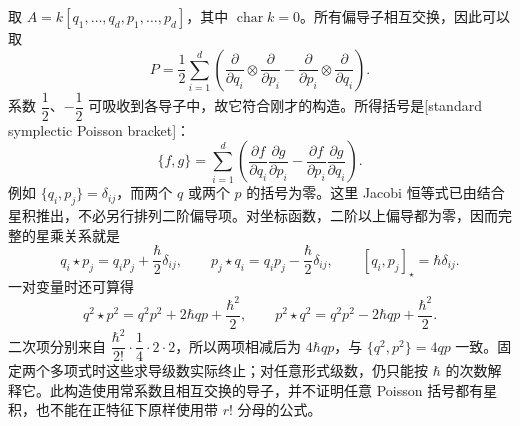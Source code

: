 取 \(A=k[q_1,\ldots,q_d,p_1,\ldots,p_d]\)，其中 \(\operatorname{char}k=0\)。所有偏导子相互交换，因此可以取
\[
	P=\frac12\sum_{i=1}^d
	\left(\frac{\partial}{\partial q_i}\otimes\frac{\partial}{\partial p_i}
	-\frac{\partial}{\partial p_i}\otimes\frac{\partial}{\partial q_i}\right).
\]
系数 \(\dfrac12\)、\(-\dfrac12\) 可吸收到各导子中，故它符合刚才的构造。所得括号是[standard symplectic Poisson bracket]：
\begin{equation}\label{b4:eq:standard-symplectic-poisson}
	\{f,g\}=\sum_{i=1}^d
	\left(\frac{\partial f}{\partial q_i}\frac{\partial g}{\partial p_i}
	-\frac{\partial f}{\partial p_i}\frac{\partial g}{\partial q_i}\right).
\end{equation}
例如 \(\{q_i,p_j\}=\delta_{ij}\)，而两个 \(q\) 或两个 \(p\) 的括号为零。这里 Jacobi 恒等式已由结合星积推出，不必另行排列二阶偏导项。对坐标函数，二阶以上偏导都为零，因而完整的星乘关系就是
\[
	q_i\star p_j=q_ip_j+\frac{\hbar}{2}\delta_{ij},\qquad
	p_j\star q_i=q_ip_j-\frac{\hbar}{2}\delta_{ij},\qquad
	[q_i,p_j]_{\star}=\hbar\delta_{ij}.
\]
一对变量时还可算得
\[
	q^2\star p^2=q^2p^2+2\hbar qp+\frac{\hbar^2}{2},\qquad
	p^2\star q^2=q^2p^2-2\hbar qp+\frac{\hbar^2}{2}.
\]
二次项分别来自 \(\dfrac{\hbar^2}{2!}\cdot\dfrac14\cdot2\cdot2\)，所以两项相减后为 \(4\hbar qp\)，与 \(\{q^2,p^2\}=4qp\) 一致。固定两个多项式时这些求导级数实际终止；对任意形式级数，仍只能按 \(\hbar\) 的次数解释它。此构造使用常系数且相互交换的导子，并不证明任意 Poisson 括号都有星积，也不能在正特征下原样使用带 \(r!\) 分母的公式。
